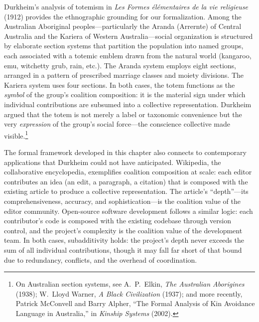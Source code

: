 Durkheim's analysis of totemism in \textit{Les Formes élémentaires de la
vie religieuse} (1912) provides the ethnographic grounding for our
formalization.  Among the Australian Aboriginal peoples---particularly the
Aranda (Arrernte) of Central Australia and the Kariera of Western
Australia---social organization is structured by elaborate section systems
that partition the population into named groups, each associated with a
totemic emblem drawn from the natural world (kangaroo, emu, witchetty grub,
rain, etc.).  The Aranda system employs eight sections, arranged in a
pattern of prescribed marriage classes and moiety divisions.  The Kariera
system uses four sections.  In both cases, the totem functions as the
\emph{symbol} of the group's coalition composition: it is the material sign
under which individual contributions are subsumed into a collective
representation.  Durkheim argued that the totem is not merely a label or
taxonomic convenience but the very \emph{expression} of the group's social
force---the conscience collective made visible.\footnote{On Australian
section systems, see A.~P.~Elkin, \textit{The Australian Aborigines} (1938);
W.~Lloyd Warner, \textit{A Black Civilization} (1937); and more recently,
Patrick McConvell and Barry Alpher, ``The Formal Analysis of Kin Avoidance
Language in Australia,'' in \textit{Kinship Systems} (2002).}

The formal framework developed in this chapter also connects to contemporary
applications that Durkheim could not have anticipated.  Wikipedia, the
collaborative encyclopedia, exemplifies coalition composition at scale:
each editor contributes an idea (an edit, a paragraph, a citation) that is
composed with the existing article to produce a collective representation.
The article's ``depth''---its comprehensiveness, accuracy, and
sophistication---is the coalition value of the editor community.
Open-source software development follows a similar logic: each contributor's
code is composed with the existing codebase through version control, and the
project's complexity is the coalition value of the development team.  In
both cases, subadditivity holds: the project's depth never exceeds the sum
of all individual contributions, though it may fall far short of that
bound due to redundancy, conflicts, and the overhead of coordination.

